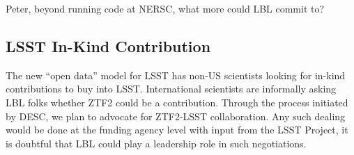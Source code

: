 Peter, beyond running code at NERSC, what more could LBL commit to? 


\subsection{LSST In-Kind Contribution}
The new ``open data'' model for LSST has non-US scientists looking for in-kind contributions to buy into
LSST.  International scientists are informally asking LBL folks  whether  ZTF2 could be a contribution.
Through the process initiated by DESC, we plan to advocate for ZTF2-LSST collaboration.
Any such dealing would be done at the funding agency level with input from the LSST Project,
it is doubtful that LBL could play a leadership role in such negotiations.
